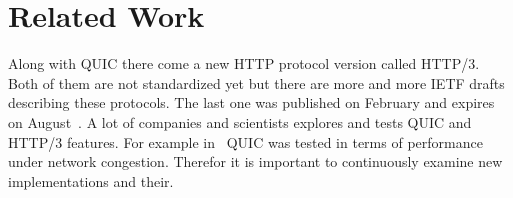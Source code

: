 
\section{Related Work}
\label{sec:related-work}
Along with QUIC there come a new HTTP protocol version called HTTP/3.
Both of them are not standardized yet but there are more and more
IETF drafts describing these protocols.
The last one was published on February and expires on August~\cite{http3-ietf}.
A lot of companies and scientists explores and tests QUIC and HTTP/3
features.
For example in~\cite{quic-master-thesis} QUIC was tested in terms of performance under
network congestion.
Therefor it is important to continuously examine new implementations
and their.
